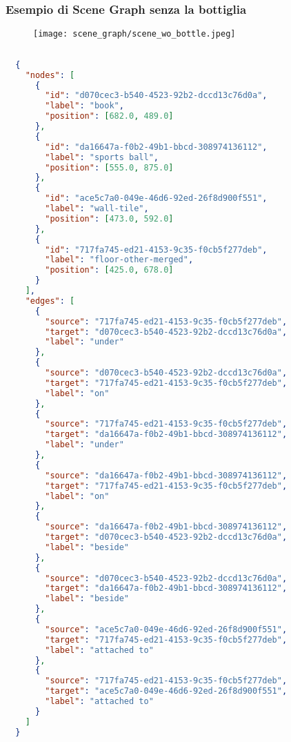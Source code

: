 \subsubsection{Esempio di Scene Graph senza la bottiglia}
\begin{figure}[H]
  \centering
  \texttt{[image: scene\_graph/scene\_wo\_bottle.jpeg]}
\end{figure}
\begin{lstlisting}[language=json]
  
  {
    "nodes": [
      {
        "id": "d070cec3-b540-4523-92b2-dccd13c76d0a",
        "label": "book",
        "position": [682.0, 489.0]
      },
      {
        "id": "da16647a-f0b2-49b1-bbcd-308974136112",
        "label": "sports ball",
        "position": [555.0, 875.0]
      },
      {
        "id": "ace5c7a0-049e-46d6-92ed-26f8d900f551",
        "label": "wall-tile",
        "position": [473.0, 592.0]
      },
      {
        "id": "717fa745-ed21-4153-9c35-f0cb5f277deb",
        "label": "floor-other-merged",
        "position": [425.0, 678.0]
      }
    ],
    "edges": [
      {
        "source": "717fa745-ed21-4153-9c35-f0cb5f277deb",
        "target": "d070cec3-b540-4523-92b2-dccd13c76d0a",
        "label": "under"
      },
      {
        "source": "d070cec3-b540-4523-92b2-dccd13c76d0a",
        "target": "717fa745-ed21-4153-9c35-f0cb5f277deb",
        "label": "on"
      },
      {
        "source": "717fa745-ed21-4153-9c35-f0cb5f277deb",
        "target": "da16647a-f0b2-49b1-bbcd-308974136112",
        "label": "under"
      },
      {
        "source": "da16647a-f0b2-49b1-bbcd-308974136112",
        "target": "717fa745-ed21-4153-9c35-f0cb5f277deb",
        "label": "on"
      },
      {
        "source": "da16647a-f0b2-49b1-bbcd-308974136112",
        "target": "d070cec3-b540-4523-92b2-dccd13c76d0a",
        "label": "beside"
      },
      {
        "source": "d070cec3-b540-4523-92b2-dccd13c76d0a",
        "target": "da16647a-f0b2-49b1-bbcd-308974136112",
        "label": "beside"
      },
      {
        "source": "ace5c7a0-049e-46d6-92ed-26f8d900f551",
        "target": "717fa745-ed21-4153-9c35-f0cb5f277deb",
        "label": "attached to"
      },
      {
        "source": "717fa745-ed21-4153-9c35-f0cb5f277deb",
        "target": "ace5c7a0-049e-46d6-92ed-26f8d900f551",
        "label": "attached to"
      }
    ]
  }
\end{lstlisting}
